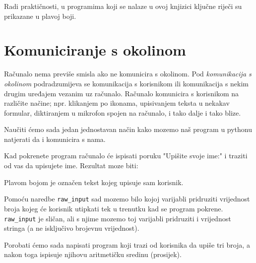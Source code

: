 	Radi praktičnosti, u programima koji se nalaze u ovoj knjizici ključne
	riječi su prikazane u plavoj boji.

\section{Komuniciranje s okolinom}

	Računalo nema previše smisla ako ne komunicira s okolinom. Pod
	\emph{komunikacija s okolinom} podradzumijeva se komunikacija s korisnikom ili
	komunikacija s nekim drugim uređajem vezanim uz računalo. Računalo
	komunicira s korisnikom na različite načine; npr. klikanjem po ikonama,
	upisivanjem teksta u nekakav formular, diktiranjem u mikrofon spojen 
	na računalo, i tako dalje i tako blize.

	Naučiti ćemo sada jedan jednostavan način kako mozemo naš program u
	pythonu natjerati da i komunicira s nama.


	Kad pokrenete program računalo će ispisati poruku "Upišite svoje ime:" i
	traziti od vas da upisujete ime. Rezultat moze biti:


	Plavom bojom je označen tekst kojeg upisuje sam korisnik.

	Pomoću naredbe \verb+raw_input+ sad mozemo bilo kojoj varijabli 
	pridruziti vrijednost broja kojeg će korisnik utipkati tek u trenutku kad 
	se program pokrene. \verb"raw_input" je sličan, ali s njime mozemo toj
	varijabli pridruziti i vrijednost stringa (a ne isključivo brojevnu
	vrijednost).

	Porobati ćemo sada napisati program koji trazi od korisnika da upiše 
	tri broja, a nakon toga ispisuje njihovu aritmetičku sredinu (prosijek).


